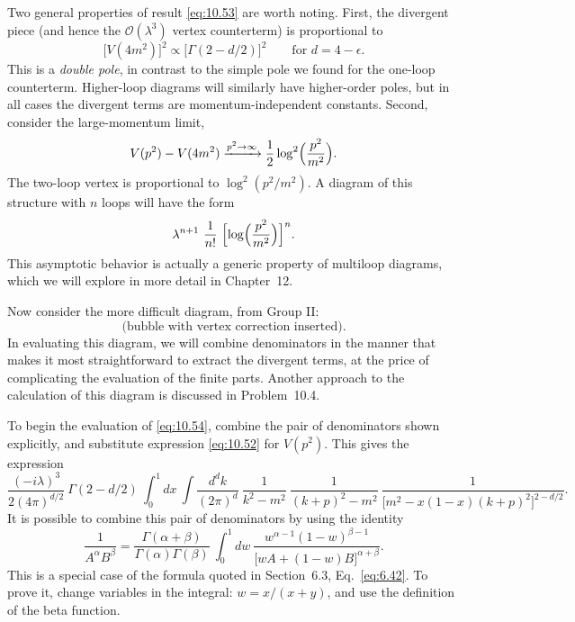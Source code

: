 Two general properties of result \eqref{eq:10.53} are worth noting.  First,
the divergent piece (and hence the $\mathcal{O}(\lambda^3)$ vertex
counterterm) is proportional to
\begin{equation}
  \bigl[ V(4m^2) \bigr]^2 \propto \bigl[ \Gamma(2-d/2) \bigr]^2
  \qquad \text{for } d = 4-\epsilon .
\end{equation}
This is a \emph{double pole}, in contrast to the simple pole we found for the
one-loop counterterm.  Higher-loop diagrams will similarly have higher-order
poles, but in all cases the divergent terms are momentum-independent
constants.  Second, consider the large-momentum limit,
\begin{equation}
  V(p^2) - V(4m^2) \xrightarrow{p^2\to\infty}
    \frac{1}{2}\log^2\Bigl( \frac{p^2}{m^2} \Bigr) .
\end{equation}
The two-loop vertex is proportional to $\log^2(p^2/m^2)$.  A diagram of this
structure with $n$ loops will have the form
\begin{equation}
  \lambda^{n+1}\ \frac{1}{n!}\ \Bigl[ \log\Bigl( \frac{p^2}{m^2} \Bigr)
    \Bigr]^n .
\end{equation}
This asymptotic behavior is actually a generic property of multiloop diagrams,
which we will explore in more detail in Chapter~12.

Now consider the more difficult diagram, from Group II:
\begin{equation}
  \text{(bubble with vertex correction inserted)} .
  \label{eq:10.54}
\end{equation}
In evaluating this diagram, we will combine denominators in the manner that
makes it most straightforward to extract the divergent terms, at the price of
complicating the evaluation of the finite parts.  Another approach to the
calculation of this diagram is discussed in Problem~10.4.

To begin the evaluation of \eqref{eq:10.54}, combine the pair of denominators
shown explicitly, and substitute expression \eqref{eq:10.52} for $V(p^2)$.
This gives the expression
\begin{equation}
  \frac{(-i\lambda)^3}{2(4\pi)^{d/2}}\ \Gamma(2-d/2)\ \int_0^1 dx\ \int
    \frac{d^dk}{(2\pi)^d}\ \frac{1}{k^2-m^2}\ \frac{1}{(k+p)^2-m^2}\
    \frac{1}{\bigl[ m^2 - x(1-x)(k+p)^2 \bigr]^{2-d/2}} .
  \label{eq:10.55}
\end{equation}
It is possible to combine this pair of denominators by using the identity
\begin{equation}
  \frac{1}{A^\alpha B^\beta} = \frac{\Gamma(\alpha+\beta)}
    {\Gamma(\alpha)\Gamma(\beta)}\ \int_0^1 dw\ \frac{w^{\alpha-1}(1-w)^{\beta-1}}
      {\bigl[ wA + (1-w)B \bigr]^{\alpha+\beta}} .
  \label{eq:10.56}
\end{equation}
This is a special case of the formula quoted in Section~6.3,
Eq.~\eqref{eq:6.42}.  To prove it, change variables in the integral:
$w = x/(x+y)$, and use the definition of the beta function.

